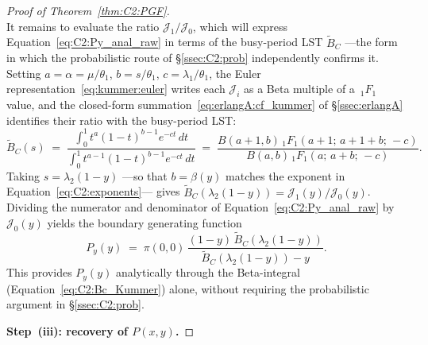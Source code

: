 \begin{proof}[Proof of Theorem~\ref{thm:C2:PGF}]
\begin{equation}
    \label{eq:C2:Py_anal_raw}
\end{equation}
It remains to evaluate the ratio $\mathcal{J}_1/\mathcal{J}_0$, which will express Equation~\eqref{eq:C2:Py_anal_raw} in terms of the busy-period LST $\widetilde{B}_C$ ---the form in which the probabilistic route of \S\ref{ssec:C2:prob} independently confirms it. Setting $a=\alpha=\mu/\theta_1$, $b=s/\theta_1$, $c=\lambda_1/\theta_1$, the Euler representation~\eqref{eq:kummer:euler} writes each $\mathcal{J}_i$ as a Beta multiple of a $\,{}_1F_1$ value, and the closed-form summation~\eqref{eq:erlangA:cf_kummer} of \S\ref{ssec:erlangA} identifies their ratio with the busy-period LST:
\begin{equation}
    \widetilde{B}_C(s) \;=\; \frac{\displaystyle\int_{0}^{1} t^{a}(1-t)^{b-1}e^{-ct}\,dt}{\displaystyle\int_{0}^{1} t^{a-1}(1-t)^{b-1}e^{-ct}\,dt}
    \;=\; \frac{B(a+1,b)\,{}_1F_1(a+1;\,a+1+b;\,-c)}{B(a,b)\,{}_1F_1(a;\,a+b;\,-c)}.
    \label{eq:C2:Bc_Kummer}
\end{equation}
Taking $s=\lambda_2(1-y)$ ---so that $b=\beta(y)$ matches the exponent in Equation~\eqref{eq:C2:exponents}--- gives $\widetilde{B}_C(\lambda_2(1-y))=\mathcal{J}_1(y)/\mathcal{J}_0(y)$. Dividing the numerator and denominator of Equation~\eqref{eq:C2:Py_anal_raw} by $\mathcal{J}_0(y)$ yields the boundary generating function
\begin{equation}
    P_y(y) \;=\; \pi(0,0)\,\frac{(1-y)\,\widetilde{B}_C(\lambda_2(1-y))}{\widetilde{B}_C(\lambda_2(1-y)) - y}.
    \label{eq:C2:Py}
\end{equation}
This provides $P_y(y)$ analytically through the Beta-integral (Equation~\eqref{eq:C2:Bc_Kummer}) alone, without requiring the probabilistic argument in \S\ref{ssec:C2:prob}.

\medskip\noindent\textbf{Step~(iii): recovery of $P(x,y)$.}


\end{proof}
